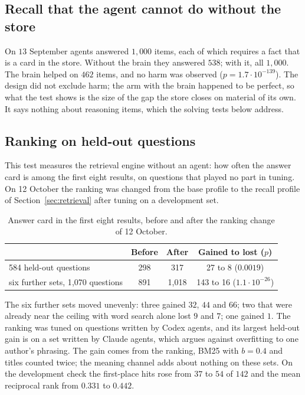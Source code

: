 \subsection{Recall that the agent cannot do without the store}
On $13$ September agents answered $1{,}000$ items, each of which requires a fact that is a card in the store. Without the brain they answered $538$; with it, all $1{,}000$. The brain helped on $462$ items, and no harm was observed ($p=1.7\cdot10^{-139}$). The design did not exclude harm; the arm with the brain happened to be perfect, so what the test shows is the size of the gap the store closes on material of its own. It says nothing about reasoning items, which the solving tests below address.

\subsection{Ranking on held-out questions}
This test measures the retrieval engine without an agent: how often the answer card is among the first eight results, on questions that played no part in tuning. On 12 October the ranking was changed from the base profile to the recall profile of Section~\ref{sec:retrieval} after tuning on a development set.

\begin{table}[ht]
\centering\small
\begin{tabular}{lccc}
\toprule
 & Before & After & Gained to lost ($p$)\\
\midrule
584 held-out questions & 298 & 317 & 27 to 8 ($0.0019$)\\
six further sets, 1{,}070 questions & 891 & 1{,}018 & 143 to 16 ($1.1\cdot10^{-26}$)\\
\bottomrule
\end{tabular}
\caption{Answer card in the first eight results, before and after the ranking change of 12 October.}
\label{tab:ranking}
\end{table}

The six further sets moved unevenly: three gained $32$, $44$ and $66$; two that were already near the ceiling with word search alone lost $9$ and $7$; one gained $1$. The ranking was tuned on questions written by Codex agents, and its largest held-out gain is on a set written by Claude agents, which argues against overfitting to one author's phrasing. The gain comes from the ranking, BM25 with $b=0.4$ and titles counted twice; the meaning channel adds about nothing on these sets. On the development check the first-place hits rose from $37$ to $54$ of $142$ and the mean reciprocal rank from $0.331$ to $0.442$.

